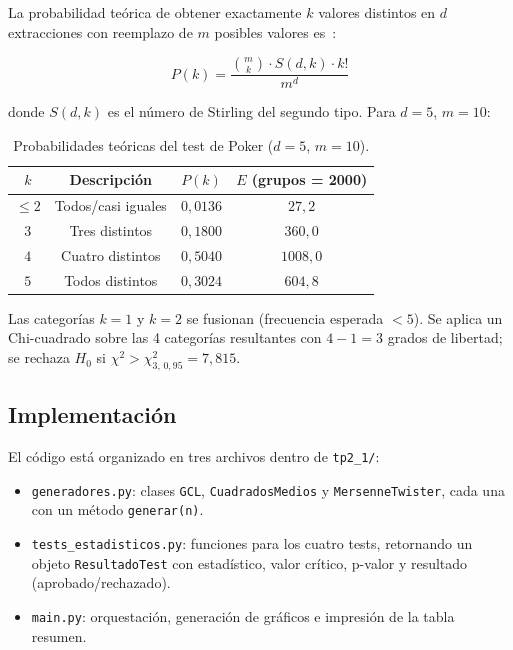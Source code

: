 \documentclass[a4paper, 11pt]{article}
\begin{document}
La probabilidad teórica de obtener exactamente $k$ valores distintos en $d$
extracciones con reemplazo de $m$ posibles valores es~\cite{knuth1997art}:

\begin{equation}
  P(k) = \frac{\binom{m}{k} \cdot S(d,k) \cdot k!}{m^d}
  \label{eq:poker_prob}
\end{equation}

donde $S(d,k)$ es el número de Stirling del segundo tipo. Para $d=5$, $m=10$:

\begin{table}[H]
  \centering
  \caption{Probabilidades teóricas del test de Poker ($d=5$, $m=10$).}
  \label{tab:poker_probs}
  \begin{tabular}{cccc}
    \toprule
    $k$ & Descripción & $P(k)$ & $E$ (grupos = 2000) \\
    \midrule
    $\leq 2$ & Todos/casi iguales & $0{,}0136$ & $27{,}2$ \\
    $3$      & Tres distintos     & $0{,}1800$ & $360{,}0$ \\
    $4$      & Cuatro distintos   & $0{,}5040$ & $1008{,}0$ \\
    $5$      & Todos distintos    & $0{,}3024$ & $604{,}8$ \\
    \bottomrule
  \end{tabular}
\end{table}

Las categorías $k=1$ y $k=2$ se fusionan (frecuencia esperada $< 5$).
Se aplica un Chi-cuadrado sobre las 4 categorías resultantes con $4-1=3$
grados de libertad; se rechaza $H_0$ si $\chi^2 > \chi^2_{3,\,0{,}95} = 7{,}815$.

\subsection{Implementación}

El código está organizado en tres archivos dentro de \texttt{tp2\_1/}:

\begin{itemize}
  \item \texttt{generadores.py}: clases \texttt{GCL}, \texttt{CuadradosMedios}
        y \texttt{MersenneTwister}, cada una con un método \texttt{generar(n)}.
  \item \texttt{tests\_estadisticos.py}: funciones para los cuatro tests,
        retornando un objeto \texttt{ResultadoTest} con estadístico, valor
        crítico, p-valor y resultado (aprobado/rechazado).
  \item \texttt{main.py}: orquestación, generación de gráficos e impresión
        de la tabla resumen.
\end{itemize}
\end{document}
